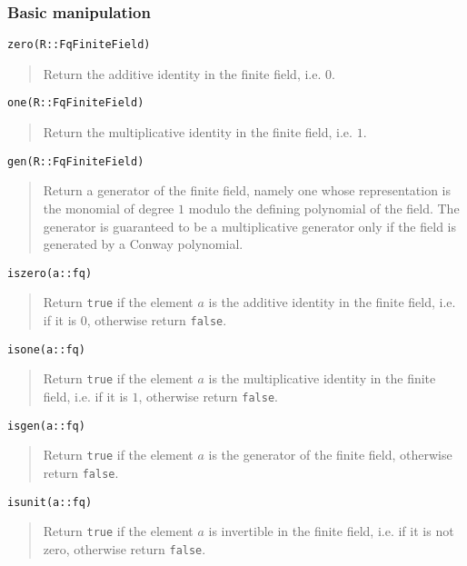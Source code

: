 \documentclass[a4paper,10pt]{article}
\newcommand{\code}{\lstinline}
\newcommand{\desc}[1]{\vspace{-3mm}\begin{quote}#1\end{quote}}
\begin{document}
{{\subsubsection{Basic manipulation}

\begin{lstlisting}
zero(R::FqFiniteField)
\end{lstlisting}

\desc{Return the additive identity in the finite field, i.e. $0$.}

\begin{lstlisting}
one(R::FqFiniteField)
\end{lstlisting}

\desc{Return the multiplicative identity in the finite field, i.e. $1$.}

\begin{lstlisting}
gen(R::FqFiniteField)
\end{lstlisting}

\desc{Return a generator of the finite field, namely one whose
representation is the monomial of degree $1$ modulo the defining
polynomial of the field. The generator is guaranteed to be a multiplicative 
generator only if the field is generated by a Conway polynomial.}

\begin{lstlisting}
iszero(a::fq)
\end{lstlisting}

\desc{Return \code{true} if the element $a$ is the additive identity in the
finite field, i.e. if it is $0$, otherwise return \code{false}.}

\begin{lstlisting}
isone(a::fq)
\end{lstlisting}

\desc{Return \code{true} if the element $a$ is the multiplicative identity in
the finite field, i.e. if it is $1$, otherwise return \code{false}.}

\begin{lstlisting}
isgen(a::fq)
\end{lstlisting}

\desc{Return \code{true} if the element $a$ is the generator of the finite field,
otherwise return \code{false}.}

\begin{lstlisting}
isunit(a::fq)
\end{lstlisting}

\desc{Return \code{true} if the element $a$ is invertible in the finite field,
i.e. if it is not zero, otherwise return \code{false}.}

}}
\end{document}
